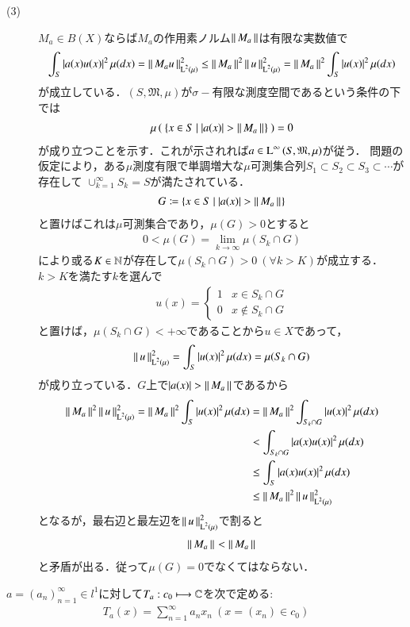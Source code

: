 \begin{prf}
\begin{description}
	\item[(3)] $M_a \in B(X)$ならば$M_a$の作用素ノルム$\left\|\, M_a\, \right\|_{}$は有限な実数値で
		\begin{align}
			\int_{S} |a(x)u(x)|^2\, \mu(dx) 
			= \left\|\, M_au\, \right\|_{\operatorname{L}^{2} \left(\mu\right)}^2 \leq \left\|\, M_a\, \right\|_{}^2 \left\|\, u\, \right\|_{\operatorname{L}^{2} \left(\mu\right)}^2 
			= \left\|\, M_a\, \right\|_{}^2 \int_{S} |u(x)|^2\, \mu(dx)
		\end{align}
		が成立している．$(S, \mathfrak{M}, \mu)$が$\sigma-$有限な測度空間であるという条件の下では
		\begin{align}
			\mu\left(\ \{x \in S\ |\ |a(x)| > \left\|\, M_a\, \right\|_{}\}\ \right) = 0
		\end{align}
		が成り立つことを示す．これが示されれば$a \in \operatorname{L}^{\infty} \left(S, \mathfrak{M}, \mu\right)$が従う．
		問題の仮定により，ある$\mu$測度有限で単調増大な$\mu$可測集合列$S_1 \subset S_2 \subset S_3 \subset \cdots$が存在して
		$\cup_{k=1}^{\infty}S_k = S$が満たされている．
		\begin{align}
			G \coloneqq \{x \in S\ |\ |a(x)| > \left\|\, M_a\, \right\|_{}\}
		\end{align}
		と置けばこれは$\mu$可測集合であり，$\mu(G) > 0$とすると
		\begin{align}
			0 < \mu(G) = \lim_{k \to \infty} \mu(S_k \cap G)
		\end{align}
		により或る$K \in \mathbb{N}$が存在して$\mu(S_k \cap G) > 0 \ (\forall k > K)$が成立する．$k > K$を満たす$k$を選んで
		\begin{align}
			u(x) = \begin{cases}
				1 & x \in S_k \cap G \\
				0 & x \notin S_k \cap G
			\end{cases}
		\end{align}
		と置けば，$\mu(S_k \cap G) < +\infty$であることから$u \in X$であって，
		\begin{align}
			\left\|\, u\, \right\|_{\operatorname{L}^{2} \left(\mu\right)}^2 = \int_{S} |u(x)|^2\, \mu(dx) = \mu(S_k \cap G)
		\end{align}
		が成り立っている．$G$上で$|a(x)| > \left\|\, M_a\, \right\|_{}$であるから
		\begin{align}
			\left\|\, M_a\, \right\|_{}^2 \left\|\, u\, \right\|_{\operatorname{L}^{2} \left(\mu\right)}^2 
			= \left\|\, M_a\, \right\|_{}^2 \int_{S} |u(x)|^2\, \mu(dx) 
			&= \left\|\, M_a\, \right\|_{}^2 \int_{S_k \cap G} |u(x)|^2\, \mu(dx) \\
			&< \int_{S_k \cap G} |a(x)u(x)|^2\, \mu(dx) \\
			&\leq \int_{S} |a(x)u(x)|^2\, \mu(dx) \\
			&\leq \left\|\, M_a\, \right\|_{}^2 \left\|\, u\, \right\|_{\operatorname{L}^{2} \left(\mu\right)}^2 
		\end{align}
		となるが，最右辺と最左辺を$\left\|\, u\, \right\|_{\operatorname{L}^{2} \left(\mu\right)}^2$で割ると
		\begin{align}
			\left\|\, M_a\, \right\|_{} < \left\|\, M_a\, \right\|_{}
		\end{align}
		と矛盾が出る．従って$\mu(G)=0$でなくてはならない．
		\QED
\end{description}
\end{prf}

\begin{qst}
	$a = (a_n)_{n=1}^{\infty} \in l^1$に対して$T_a:c_0 \longmapsto \mathbb{C}$を次で定める:
	\begin{align}
		T_a(x) = \sum_{n=1}^{\infty}a_n x_n\ (x=(x_n) \in c_0)
	\end{align}
\end{qst}








